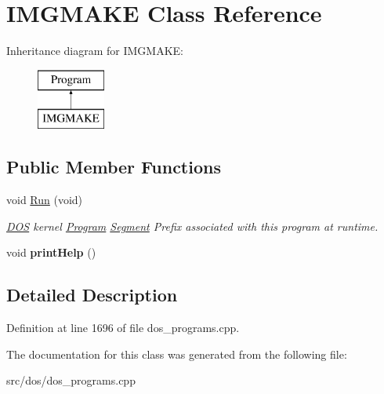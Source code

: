 \hypertarget{classIMGMAKE}{\section{I\-M\-G\-M\-A\-K\-E Class Reference}
\label{classIMGMAKE}
}
Inheritance diagram for I\-M\-G\-M\-A\-K\-E\-:\begin{figure}[H]
\begin{center}
\leavevmode
\includegraphics[height=2.000000cm]{classIMGMAKE}
\end{center}
\end{figure}
\subsection*{Public Member Functions}
\begin{DoxyCompactItemize}
\item 
\hypertarget{classIMGMAKE_afbd2116356dab83d08b978c72ee74340}{void \hyperlink{classIMGMAKE_afbd2116356dab83d08b978c72ee74340}{Run} (void)}\label{classIMGMAKE_afbd2116356dab83d08b978c72ee74340}

\begin{DoxyCompactList}\small\item\em \hyperlink{classDOS}{D\-O\-S} kernel \hyperlink{classProgram}{Program} \hyperlink{structSegment}{Segment} Prefix associated with this program at runtime. \end{DoxyCompactList}\item 
\hypertarget{classIMGMAKE_aed2e86f96068d3380ddc72eb78377938}{void {\bfseries print\-Help} ()}\label{classIMGMAKE_aed2e86f96068d3380ddc72eb78377938}

\end{DoxyCompactItemize}


\subsection{Detailed Description}


Definition at line 1696 of file dos\-\_\-programs.\-cpp.



The documentation for this class was generated from the following file\-:\begin{DoxyCompactItemize}
\item 
src/dos/dos\-\_\-programs.\-cpp\end{DoxyCompactItemize}
